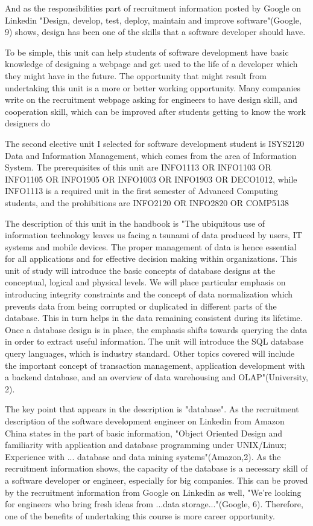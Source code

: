 \documentclass[12pt]{article}
\begin{document}
And as the responsibilities part of recruitment information posted by Google on Linkedin "Design, develop, test, deploy, maintain and improve software"(Google, 9) shows, design has been one of the skills that a software developer should have.

To be simple, this unit can help students of software development have basic knowledge of designing a webpage and get used to the life of a developer which they might have in the future.
The opportunity that might result from undertaking this unit is a more or better working opportunity. Many companies write on the recruitment webpage asking for engineers to have design skill, and cooperation skill, which can be improved after students getting to know the work designers do

The second elective unit I selected for software development student is ISYS2120 Data and Information Management, which comes from the area of Information System. The prerequisites of this unit are INFO1113 OR INFO1103 OR INFO1105 OR INFO1905 OR INFO1003 OR INFO1903 OR DECO1012, while INFO1113 is a required unit in the first semester of Advanced Computing students, and the prohibitions are INFO2120 OR INFO2820 OR COMP5138

The description of this unit in the handbook is "The ubiquitous use of information technology leaves us facing a tsunami of data produced by users, IT systems and mobile devices. The proper management of data is hence essential for all applications and for effective decision making within organizations.
This unit of study will introduce the basic concepts of database designs at the conceptual, logical and physical levels. We will place particular emphasis on introducing integrity constraints and the concept of data normalization which prevents data from being corrupted or duplicated in different parts of the database. This in turn helps in the data remaining consistent during its lifetime. Once a database design is in place, the emphasis shifts towards querying the data in order to extract useful information. The unit will introduce the SQL database query languages, which is industry standard. Other topics covered will include the important concept of transaction management, application development with a backend database, and an overview of data warehousing and OLAP"(University, 2).

The key point that appears in the description is "database". As the recruitment description of the software development engineer on Linkedin from Amazon China states in the part of basic information, "Object Oriented Design and familiarity with application and database programming under UNIX/Linux; Experience with ... database and data mining systems"(Amazon,2). As the recruitment information shows, the capacity of the database is a necessary skill of a software developer or engineer, especially for big companies. This can be proved by the recruitment information from Google on Linkedin as well, "We're looking for engineers who bring fresh ideas from ...data storage..."(Google, 6). Therefore, one of the benefits of undertaking this course is more career opportunity.
\end{document}
